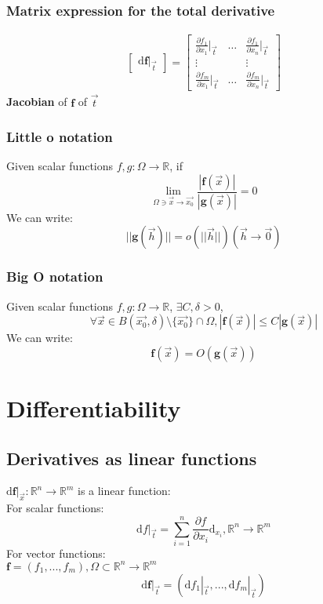 \documentclass[11pt, a4paper]{article}
\begin{document}
   \subsubsection{Matrix expression for the total derivative}
   $$\begin{aligned}
       \begin{bmatrix}
           \mathrm{d}\bm{f}|_{\vec{t}}
       \end{bmatrix} = 
       \begin{bmatrix}
           \frac{\partial f_1}{\partial x_1}|_{\vec{t}} & \ldots & \frac{\partial f_1}{\partial x_n}|_{\vec{t}} \\
           \vdots & & \vdots \\
           \frac{\partial f_m}{\partial x_1}|_{\vec{t}} & \ldots & \frac{\partial f_m}{\partial x_n}|_{\vec{t}}
       \end{bmatrix}
   \end{aligned}$$
   \textbf{Jacobian} of $\bm{f}$ of $\vec{t}$
   \subsubsection{Little o notation}
   Given scalar functions $f, g: \Omega \to \mathbb{R}$, if
   $$\lim\limits_{\Omega \ni \vec{x} \to \vec{x_0}} \frac{|\bm{f}(\vec{x})|}{|\bm{g}(\vec{x})|} = 0$$
   We can write:
   $$||\bm{g}(\vec{h})|| = o(||\vec{h}||) (\vec{h} \to \vec{0})$$
   \subsubsection{Big O notation}
   Given scalar functions $f, g: \Omega \to \mathbb{R}$, $\exists C, \delta > 0$,
   $$\forall \vec{x} \in B(\vec{x_0}, \delta) \setminus \{\vec{x_0}\} \cap \Omega, |\bm{f}(\vec{x})| \leq C|\bm{g}(\vec{x})|$$
   We can write:
   $$\bm{f}(\vec{x}) = O(\bm{g}(\vec{x}))$$
\section{Differentiability}
   \subsection{Derivatives as linear functions}
   $\mathrm{d}\bm{f}|_{\vec{x}}: \mathbb{R}^n \to \mathbb{R}^m$ is a linear function: \\
   For scalar functions:
   $$\mathrm{d}f|_{\vec{t}} = \sum\limits_{i = 1}^n \frac{\partial f}{\partial x_i}\mathrm{d}_{x_i}, \mathbb{R}^n \to \mathbb{R}^m$$
   For vector functions: \\
   $\bm{f} = (f_1, ..., f_m), \Omega \subset \mathbb{R}^n \to \mathbb{R}^m$
   $$\mathrm{d}\bm{f}|_{\vec{t}} = (\mathrm{d}f_1|_{\vec{t}}, ...,\mathrm{d}f_m|_{\vec{t}})$$
\end{document}
